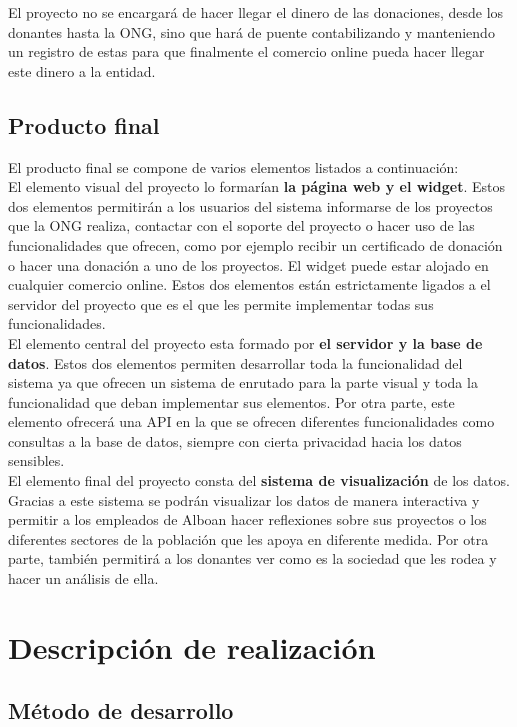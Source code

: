 El proyecto no se encargará de hacer llegar el dinero de las donaciones, desde los donantes hasta la ONG, sino que hará de puente contabilizando y manteniendo un registro de estas para que finalmente el comercio online pueda hacer llegar este dinero a la entidad.

\subsection{Producto final}
El producto final se compone de varios elementos listados a continuación:\\

El elemento visual del proyecto lo formarían \textbf{la página web y el widget}. Estos dos elementos permitirán a los usuarios del sistema informarse de los proyectos que la ONG realiza, contactar con el soporte del proyecto o hacer uso de las funcionalidades que ofrecen, como por ejemplo recibir un certificado de donación o hacer una donación a uno de los proyectos. El widget puede estar alojado en cualquier comercio online. Estos dos elementos están estrictamente ligados a el servidor del proyecto que es el que les permite implementar todas sus funcionalidades.\\

El elemento central del proyecto esta formado por \textbf{el servidor y la base de datos}. Estos dos elementos permiten desarrollar toda la funcionalidad del sistema ya que ofrecen un sistema de enrutado para la parte visual y toda la funcionalidad que deban implementar sus elementos. Por otra parte, este elemento ofrecerá una API en la que se ofrecen diferentes funcionalidades como consultas a la base de datos, siempre con cierta privacidad hacia los datos sensibles.\\

El elemento final del proyecto consta del \textbf{sistema de visualización} de los datos. Gracias a este sistema se podrán visualizar los datos de manera interactiva y permitir a los empleados de Alboan hacer reflexiones sobre sus proyectos o los diferentes sectores de la población que les apoya en diferente medida. Por otra parte, también permitirá a los donantes ver como es la sociedad que les rodea y hacer un análisis de ella.

\section{Descripción de realización}

\subsection{Método de desarrollo}

